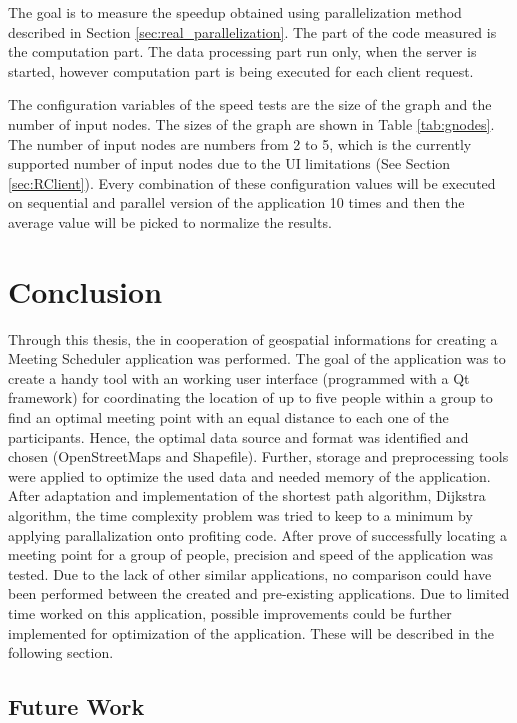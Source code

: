 \documentclass[thesis=M,english]{FITthesis}[2012/10/20]
\begin{document}
The goal is to measure the speedup obtained using parallelization method described in Section \ref{sec:real_parallelization}.
The part of the code measured is the computation part. The data processing part run only, when the server is started, however computation part is being executed for each client request.

The configuration variables of the speed tests are the size of the graph and the number of input nodes. The sizes of the graph are shown in Table \ref{tab:gnodes}. The number of input nodes are numbers from 2 to 5, which is the currently supported number of input nodes due to the UI limitations (See Section \ref{sec:RClient}). Every combination of these configuration values will be executed on sequential and parallel version of the application 10 times and then the average value will be picked to normalize the results.

\chapter{Conclusion}

Through this thesis, the in cooperation of geospatial informations for creating a Meeting Scheduler application was performed. The goal of the application was to create a handy tool with an working user interface (programmed with a Qt framework) for coordinating the location of up to five people within a group to find an optimal meeting point with an equal distance to each one of the participants. Hence, the optimal data source and format was identified and chosen (OpenStreetMaps and Shapefile). Further, storage and preprocessing tools were applied to optimize the used data and needed memory of the application. After adaptation and implementation of the shortest path algorithm, Dijkstra algorithm, the time complexity problem was tried to keep to a minimum by applying parallalization onto profiting code. After prove of successfully locating a meeting point for a group of people, precision and speed of the application was tested. Due to the lack of other similar applications, no comparison could have been performed between the created and pre-existing applications. Due to limited time worked on this application, possible improvements could be further implemented for optimization of the application. These will be described in the following section.

\section{Future Work}
\end{document}
